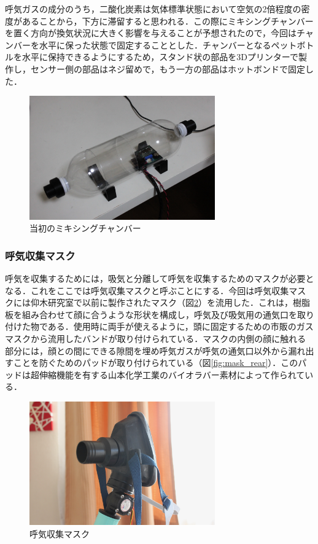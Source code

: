 呼気ガスの成分のうち，二酸化炭素は気体標準状態において空気の2倍程度の密度があることから，下方に滞留すると思われる．この際にミキシングチャンバーを置く方向が換気状況に大きく影響を与えることが予想されたので，今回はチャンバーを水平に保った状態で固定することとした．チャンバーとなるペットボトルを水平に保持できるようにするため，スタンド状の部品を3Dプリンターで製作し，センサー側の部品はネジ留めで，もう一方の部品はホットボンドで固定した．

\begin{figure}[H]
  \begin{center}
    \includegraphics[width=8cm]{fig/mixing_chamber_early}
    \caption{当初のミキシングチャンバー}
    \label{fig:mixing_chamber_early}
  \end{center}
\end{figure}

\subsubsection{呼気収集マスク}

呼気を収集するためには，吸気と分離して呼気を収集するためのマスクが必要となる．これをここでは呼気収集マスクと呼ぶことにする．今回は呼気収集マスクには仰木研究室で以前に製作された\cite{mask_build}マスク（図\ref{fig:mask_front}）を流用した．これは，樹脂板を組み合わせて顔に合うような形状を構成し，呼気及び吸気用の通気口を取り付けた物である．使用時に両手が使えるように，頭に固定するための市販のガスマスクから流用したバンドが取り付けられている．マスクの内側の顔に触れる部分には，顔との間にできる隙間を埋め呼気ガスが呼気の通気口以外から漏れ出すことを防ぐためのパッドが取り付けられている（図\ref{fig:mask_rear}）．このパッドは超伸縮機能を有する山本化学工業のバイオラバー素材によって作られている．

\begin{figure}[H]
  \begin{center}
    \includegraphics[width=8cm]{fig/mask_front}
    \caption{呼気収集マスク}
    \label{fig:mask_front}
  \end{center}
\end{figure}

